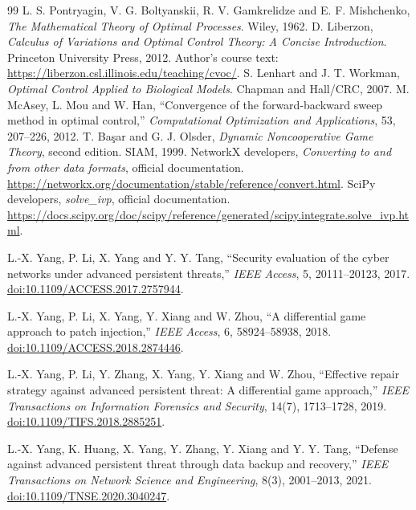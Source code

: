 \documentclass[11pt,a4paper]{article}
\theoremstyle{definition}
\theoremstyle{remark}
\begin{document}
\clearpage
\begin{thebibliography}{99}
 L. S. Pontryagin, V. G. Boltyanskii, R. V. Gamkrelidze and E. F. Mishchenko, \emph{The Mathematical Theory of Optimal Processes}. Wiley, 1962.
 D. Liberzon, \emph{Calculus of Variations and Optimal Control Theory: A Concise Introduction}. Princeton University Press, 2012. Author's course text: \url{https://liberzon.csl.illinois.edu/teaching/cvoc/}.
 S. Lenhart and J. T. Workman, \emph{Optimal Control Applied to Biological Models}. Chapman and Hall/CRC, 2007.
 M. McAsey, L. Mou and W. Han, ``Convergence of the forward-backward sweep method in optimal control,'' \emph{Computational Optimization and Applications}, 53, 207--226, 2012.
 T. Ba\c{s}ar and G. J. Olsder, \emph{Dynamic Noncooperative Game Theory}, second edition. SIAM, 1999.
 NetworkX developers, \emph{Converting to and from other data formats}, official documentation. \url{https://networkx.org/documentation/stable/reference/convert.html}.
 SciPy developers, \emph{solve\_ivp}, official documentation. \url{https://docs.scipy.org/doc/scipy/reference/generated/scipy.integrate.solve_ivp.html}.

 L.-X. Yang, P. Li, X. Yang and Y. Y. Tang, ``Security evaluation of the cyber networks under advanced persistent threats,'' \emph{IEEE Access}, 5, 20111--20123, 2017. \href{https://doi.org/10.1109/ACCESS.2017.2757944}{doi:10.1109/ACCESS.2017.2757944}.

 L.-X. Yang, P. Li, X. Yang, Y. Xiang and W. Zhou, ``A differential game approach to patch injection,'' \emph{IEEE Access}, 6, 58924--58938, 2018. \href{https://doi.org/10.1109/ACCESS.2018.2874446}{doi:10.1109/ACCESS.2018.2874446}.

 L.-X. Yang, P. Li, Y. Zhang, X. Yang, Y. Xiang and W. Zhou, ``Effective repair strategy against advanced persistent threat: A differential game approach,'' \emph{IEEE Transactions on Information Forensics and Security}, 14(7), 1713--1728, 2019. \href{https://doi.org/10.1109/TIFS.2018.2885251}{doi:10.1109/TIFS.2018.2885251}.

 L.-X. Yang, K. Huang, X. Yang, Y. Zhang, Y. Xiang and Y. Y. Tang, ``Defense against advanced persistent threat through data backup and recovery,'' \emph{IEEE Transactions on Network Science and Engineering}, 8(3), 2001--2013, 2021. \href{https://doi.org/10.1109/TNSE.2020.3040247}{doi:10.1109/TNSE.2020.3040247}.


\end{thebibliography}
\end{document}

